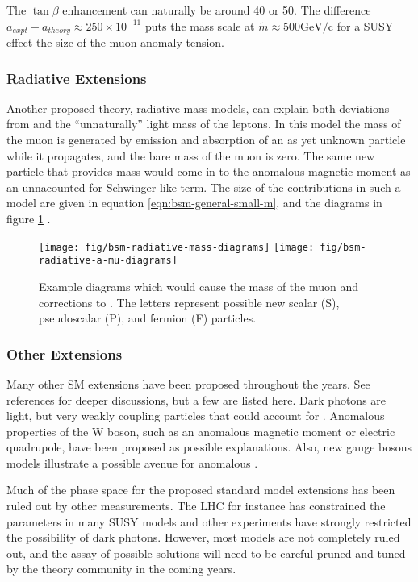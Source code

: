 The $\tan{\beta}$ enhancement can naturally be around 40 or 50.  The difference $a_{expt} - a_{theory} \approx 250 \times 10^{-11}$ puts the mass scale at $\tilde{m} \approx 500 \mathrm{GeV/c}$ for a SUSY effect the size of the muon anomaly tension.

\subsubsection{Radiative Extensions}
Another proposed theory, radiative mass models, can explain both deviations from \gmtwo and the ``unnaturally'' light mass of the leptons.  In this model the mass of the muon is generated by emission and absorption of an as yet unknown particle while it propagates, and the bare mass of the muon is zero.  The same new particle that provides mass would come in to the anomalous magnetic moment as an unnacounted for Schwinger-like term.  The size of the contributions in such a model are given in equation \ref{eqn:bsm-general-small-m}, and the diagrams in figure \ref{fig:bsm-radiative-diagrams} \cite{a-mu-harbinger}.

\begin{figure}
\centering
\texttt{[image: fig/bsm-radiative-mass-diagrams]}
\texttt{[image: fig/bsm-radiative-a-mu-diagrams]}
\caption{
    Example diagrams which would cause the mass of the muon and corrections to \mugmtwo.  The letters represent possible new scalar (S), pseudoscalar (P), and fermion (F) particles.
    \label{fig:bsm-radiative-diagrams}
}
\end{figure}

\subsubsection{Other Extensions}

Many other SM extensions have been proposed throughout the years.  See references \cite{a-mu-harbinger, the-muon-g-2, e989-tdr} for deeper discussions, but a few are listed here.  Dark photons are light, but very weakly coupling particles that could account for \mugmtwo.  Anomalous properties of the W boson, such as an anomalous magnetic moment or electric quadrupole, have been proposed as possible explanations.  Also, new gauge bosons models illustrate a possible avenue for anomalous \gmtwo.

Much of the phase space for the proposed standard model extensions has been ruled out by other measurements.  The LHC for instance has constrained the parameters in many SUSY models and other experiments have strongly restricted the possibility of dark photons.  However, most models are not completely ruled out, and the assay of possible solutions will need to be careful pruned and tuned by the theory community in the coming years.


